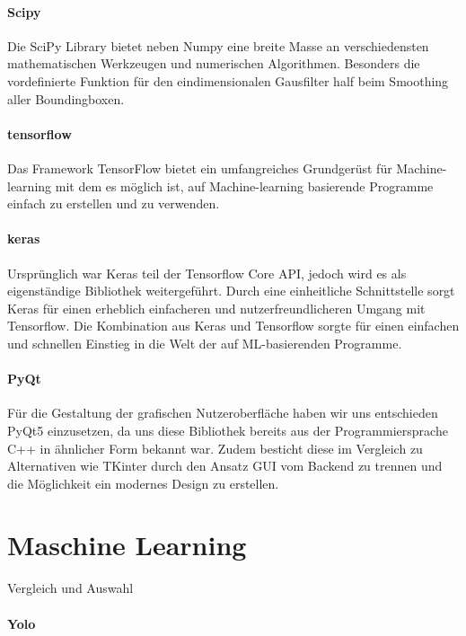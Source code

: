 \paragraph{Scipy}$~$\\
Die SciPy Library bietet neben Numpy eine breite Masse an verschiedensten mathematischen Werkzeugen und numerischen Algorithmen. Besonders die vordefinierte Funktion für den eindimensionalen Gausfilter half beim Smoothing aller Boundingboxen.

\paragraph{tensorflow}$~$\\
Das Framework TensorFlow bietet ein umfangreiches Grundgerüst für Machine-learning mit dem es möglich ist, auf Machine-learning basierende Programme einfach zu erstellen und zu verwenden.

\paragraph{keras}$~$\\
Ursprünglich war Keras teil der Tensorflow Core API, jedoch wird es als eigenständige Bibliothek weitergeführt. Durch eine einheitliche Schnittstelle sorgt Keras für einen erheblich einfacheren und nutzerfreundlicheren Umgang mit Tensorflow. Die Kombination aus Keras und Tensorflow sorgte für einen einfachen und schnellen Einstieg in die Welt der auf ML-basierenden Programme.
\paragraph{PyQt} $~$\\
Für die Gestaltung der grafischen Nutzeroberfläche haben wir uns entschieden PyQt5 einzusetzen, da uns diese Bibliothek bereits aus der Programmiersprache C++ in ähnlicher Form bekannt war. Zudem besticht diese im Vergleich zu Alternativen wie TKinter durch den Ansatz GUI vom Backend zu trennen und die Möglichkeit ein modernes Design zu erstellen.

	
\section{Maschine Learning}
Vergleich und Auswahl
\paragraph{Yolo}
